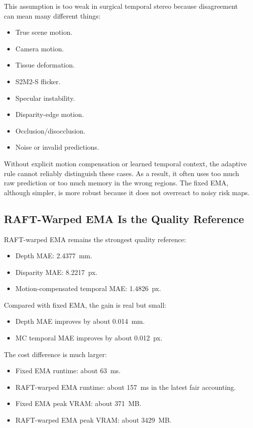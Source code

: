 \documentclass[11pt,a4paper]{article}
\begin{document}
This assumption is too weak in surgical temporal stereo because disagreement can mean many different things:

\begin{itemize}[leftmargin=*]
    \item True scene motion.
    \item Camera motion.
    \item Tissue deformation.
    \item S2M2-S flicker.
    \item Specular instability.
    \item Disparity-edge motion.
    \item Occlusion/disocclusion.
    \item Noise or invalid predictions.
\end{itemize}

Without explicit motion compensation or learned temporal context, the adaptive rule cannot reliably distinguish these cases. As a result, it often uses too much raw prediction or too much memory in the wrong regions. The fixed EMA, although simpler, is more robust because it does not overreact to noisy risk maps.

\subsection{RAFT-Warped EMA Is the Quality Reference}

RAFT-warped EMA remains the strongest quality reference:

\begin{itemize}[leftmargin=*]
    \item Depth MAE: \SI{2.4377}{mm}.
    \item Disparity MAE: \SI{8.2217}{px}.
    \item Motion-compensated temporal MAE: \SI{1.4826}{px}.
\end{itemize}

Compared with fixed EMA, the gain is real but small:

\begin{itemize}[leftmargin=*]
    \item Depth MAE improves by about \SI{0.014}{mm}.
    \item MC temporal MAE improves by about \SI{0.012}{px}.
\end{itemize}

The cost difference is much larger:

\begin{itemize}[leftmargin=*]
    \item Fixed EMA runtime: about \SI{63}{ms}.
    \item RAFT-warped EMA runtime: about \SI{157}{ms} in the latest fair accounting.
    \item Fixed EMA peak VRAM: about \SI{371}{MB}.
    \item RAFT-warped EMA peak VRAM: about \SI{3429}{MB}.
\end{itemize}
\end{document}
